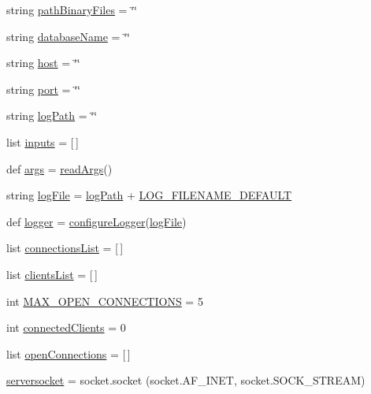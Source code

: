 \begin{DoxyCompactItemize}
\item 
string \hyperlink{namespaceserver_a34ef43a269b2139fb82ac42e3d9e525a}{path\+Binary\+Files} = \char`\"{}\char`\"{}
\item 
string \hyperlink{namespaceserver_ad56bacd311418978d78a8d1467a221a0}{database\+Name} = \char`\"{}\char`\"{}
\item 
string \hyperlink{namespaceserver_a4230afe85d97e78a1df6181d40cbe0b7}{host} = \char`\"{}\char`\"{}
\item 
string \hyperlink{namespaceserver_accc83f0ac9fb96c740cb3df16517e927}{port} = \char`\"{}\char`\"{}
\item 
string \hyperlink{namespaceserver_a45d593b7c621a117aaef105bf59d9fd5}{log\+Path} = \char`\"{}\char`\"{}
\item 
list \hyperlink{namespaceserver_acc620e319dd97213c1d3758ea4de7f68}{inputs} = \mbox{[}$\,$\mbox{]}
\item 
def \hyperlink{namespaceserver_aea7e1efc19535ee9bab8400a812b43a9}{args} = \hyperlink{namespaceserver_aa317dc86338d02253076787cc8e5d997}{read\+Args}()
\item 
string \hyperlink{namespaceserver_ab968a55cbe8af171a0fcbae9a876cab4}{log\+File} = \hyperlink{namespaceserver_a45d593b7c621a117aaef105bf59d9fd5}{log\+Path} + \hyperlink{namespaceserver_ae9611c1fa51131280e6b7c2e7ea199af}{L\+O\+G\+\_\+\+F\+I\+L\+E\+N\+A\+M\+E\+\_\+\+D\+E\+F\+A\+U\+LT}
\item 
def \hyperlink{namespaceserver_abfa1d56012bc320e4b26361390f6fc24}{logger} = \hyperlink{namespaceserver_a44a7428717edc164d7dd564478da2da3}{configure\+Logger}(\hyperlink{namespaceserver_ab968a55cbe8af171a0fcbae9a876cab4}{log\+File})
\item 
list \hyperlink{namespaceserver_a734e47a5cf907dc2e128358488a9c3e7}{connections\+List} = \mbox{[}$\,$\mbox{]}
\item 
list \hyperlink{namespaceserver_acc42864cdf2e6dd395c42dd780cbde1d}{clients\+List} = \mbox{[}$\,$\mbox{]}
\item 
int \hyperlink{namespaceserver_a8f2c905b49be657a873ebe6d354d4b47}{M\+A\+X\+\_\+\+O\+P\+E\+N\+\_\+\+C\+O\+N\+N\+E\+C\+T\+I\+O\+NS} = 5
\item 
int \hyperlink{namespaceserver_ab9cbbed2baf7ef46dcd7d67fcb351ac7}{connected\+Clients} = 0
\item 
list \hyperlink{namespaceserver_a0d0a0c96488e0f2fb395618dd4658135}{open\+Connections} = \mbox{[}$\,$\mbox{]}
\item 
\hyperlink{namespaceserver_ae005445cadfc079ed27cd779020f5f32}{serversocket} = socket.\+socket (socket.\+A\+F\+\_\+\+I\+N\+ET, socket.\+S\+O\+C\+K\+\_\+\+S\+T\+R\+E\+AM)

\end{DoxyCompactItemize}
